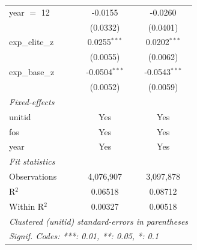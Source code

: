\begin{tabular}{lcc}
   year $=$ 12     & -0.0155         & -0.0260\\   
                   & (0.0332)        & (0.0401)\\   
   exp\_elite\_z   & 0.0255$^{***}$  & 0.0202$^{***}$\\   
                   & (0.0055)        & (0.0062)\\   
   exp\_base\_z    & -0.0504$^{***}$ & -0.0543$^{***}$\\   
                   & (0.0052)        & (0.0059)\\   
   \midrule
   \emph{Fixed-effects}\\
   unitid          & Yes             & Yes\\  
   fos             & Yes             & Yes\\  
   year            & Yes             & Yes\\  
   \midrule
   \emph{Fit statistics}\\
   Observations    & 4,076,907       & 3,097,878\\  
   R$^2$           & 0.06518         & 0.08712\\  
   Within R$^2$    & 0.00327         & 0.00518\\  
   \midrule \midrule
   \multicolumn{3}{l}{\emph{Clustered (unitid) standard-errors in parentheses}}\\
   \multicolumn{3}{l}{\emph{Signif. Codes: ***: 0.01, **: 0.05, *: 0.1}}\\
\end{tabular}
\par\endgroup


